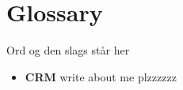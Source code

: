 \section{Glossary}

Ord og den slags står her
\begin{itemize}
	\item \textbf{CRM} write about me plzzzzzz
\end{itemize}